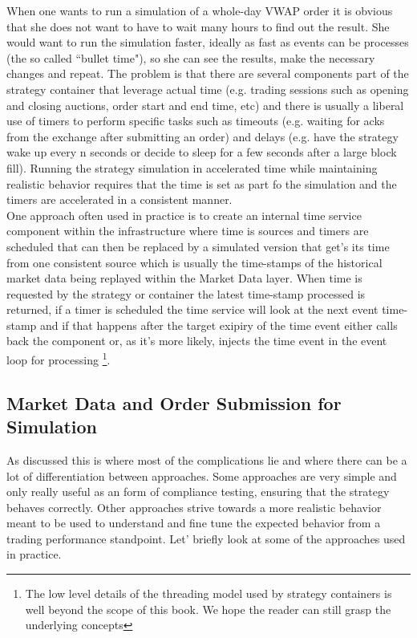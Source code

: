 When one wants to run a simulation of a whole-day VWAP order it is obvious that she does not want to have to wait many hours to find out the result. She would want to run the simulation faster, ideally as fast as events can be processes (the so called ``bullet time"), so she can see the results, make the necessary changes and repeat. The problem is that there are several components part of the strategy container that leverage actual time (e.g. trading sessions such as opening and closing auctions, order start and end time, etc) and there is usually a liberal use of timers to perform specific tasks such as timeouts (e.g. waiting for acks from the exchange after submitting an order) and delays (e.g. have the strategy wake up every n seconds or decide to sleep for a few seconds after a large block fill). Running the strategy simulation in accelerated time while maintaining realistic behavior requires that the time is set as part fo the simulation and the timers are accelerated in a consistent manner.\\

One approach often used in practice is to create an internal time service component within the infrastructure where time is sources and timers are scheduled that can then be replaced by a simulated version that get's its time from one consistent source which is usually the time-stamps of the historical market data being replayed within the Market Data layer. When time is requested by the strategy or container the latest time-stamp processed is returned, if a timer is scheduled the time service will look at the next event time-stamp and if that happens after the target exipiry of the time event either calls back the component or, as it's more likely, injects the time event in the event loop for processing \footnote{The low level details of the threading model used by strategy containers is well beyond the scope of this book. We hope the reader can still grasp the underlying concepts}.

\subsection{Market Data and Order Submission for Simulation}
As discussed this is where most of the complications lie and where there can be a lot of differentiation between approaches. Some approaches are very simple and only really useful as an form of compliance testing, ensuring that the strategy behaves correctly. Other approaches strive towards a more realistic behavior meant to be used to understand and fine tune the expected behavior from a trading performance standpoint. Let' briefly look at some of the approaches used in practice.

